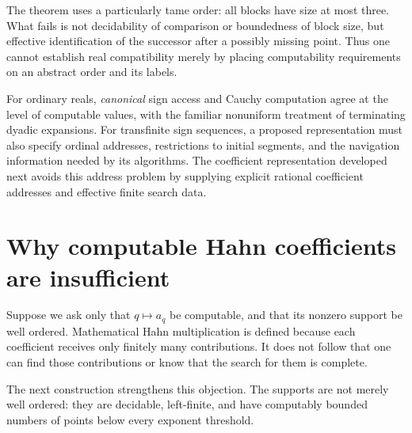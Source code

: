 \documentclass[11pt,letterpaper]{article}
\numberwithin{equation}{section}
\theoremstyle{definition}
\theoremstyle{remark}
\begin{document}
The theorem uses a particularly tame order: all blocks have size at most
three. What fails is not decidability of comparison or boundedness of block
size, but effective identification of the successor after a possibly missing
point. Thus one cannot establish real compatibility merely by placing
computability requirements on an abstract order and its labels.

For ordinary reals, \emph{canonical} sign access and Cauchy computation agree
at the level of computable values, with the familiar nonuniform treatment
of terminating dyadic expansions. For transfinite sign sequences, a proposed
representation must also specify ordinal addresses, restrictions to initial
segments, and the navigation information needed by its algorithms. The
coefficient representation developed next avoids this address problem
by supplying explicit rational coefficient addresses and effective finite search data.


\section{Why computable Hahn coefficients are insufficient}
\label{sec:badproduct}

Suppose we ask only that $q\mapsto a_q$ be computable, and that its nonzero
support be well ordered. Mathematical Hahn multiplication is defined
because each coefficient receives only finitely many contributions. It
does not follow that one can find those contributions or know that the
search for them is complete.

The next construction strengthens this objection. The supports are not
merely well ordered: they are decidable, left-finite, and have computably
bounded numbers of points below every exponent threshold.
\end{document}
